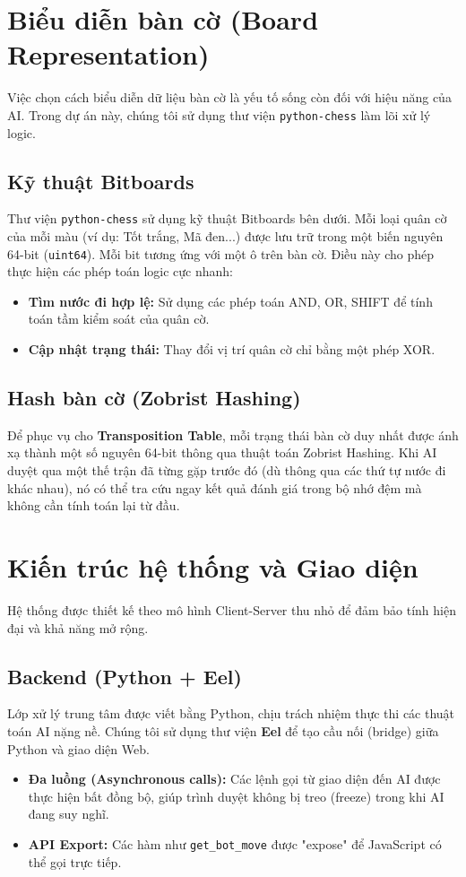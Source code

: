 \section{Biểu diễn bàn cờ (Board Representation)}

Việc chọn cách biểu diễn dữ liệu bàn cờ là yếu tố sống còn đối với hiệu năng của AI. Trong dự án này, chúng tôi sử dụng thư viện \texttt{python-chess} làm lõi xử lý logic.

\subsection{Kỹ thuật Bitboards}
Thư viện \texttt{python-chess} sử dụng kỹ thuật Bitboards bên dưới. Mỗi loại quân cờ của mỗi màu (ví dụ: Tốt trắng, Mã đen...) được lưu trữ trong một biến nguyên 64-bit (\texttt{uint64}). Mỗi bit tương ứng với một ô trên bàn cờ. Điều này cho phép thực hiện các phép toán logic cực nhanh:
\begin{itemize}
    \item \textbf{Tìm nước đi hợp lệ:} Sử dụng các phép toán AND, OR, SHIFT để tính toán tầm kiểm soát của quân cờ.
    \item \textbf{Cập nhật trạng thái:} Thay đổi vị trí quân cờ chỉ bằng một phép XOR.
\end{itemize}

\subsection{Hash bàn cờ (Zobrist Hashing)}
Để phục vụ cho \textbf{Transposition Table}, mỗi trạng thái bàn cờ duy nhất được ánh xạ thành một số nguyên 64-bit thông qua thuật toán Zobrist Hashing. Khi AI duyệt qua một thế trận đã từng gặp trước đó (dù thông qua các thứ tự nước đi khác nhau), nó có thể tra cứu ngay kết quả đánh giá trong bộ nhớ đệm mà không cần tính toán lại từ đầu.

\section{Kiến trúc hệ thống và Giao diện}

Hệ thống được thiết kế theo mô hình Client-Server thu nhỏ để đảm bảo tính hiện đại và khả năng mở rộng.

\subsection{Backend (Python + Eel)}
Lớp xử lý trung tâm được viết bằng Python, chịu trách nhiệm thực thi các thuật toán AI nặng nề. Chúng tôi sử dụng thư viện \textbf{Eel} để tạo cầu nối (bridge) giữa Python và giao diện Web. 
\begin{itemize}
    \item \textbf{Đa luồng (Asynchronous calls):} Các lệnh gọi từ giao diện đến AI được thực hiện bất đồng bộ, giúp trình duyệt không bị treo (freeze) trong khi AI đang suy nghĩ.
    \item \textbf{API Export:} Các hàm như \texttt{get\_bot\_move} được "expose" để JavaScript có thể gọi trực tiếp.
\end{itemize}

